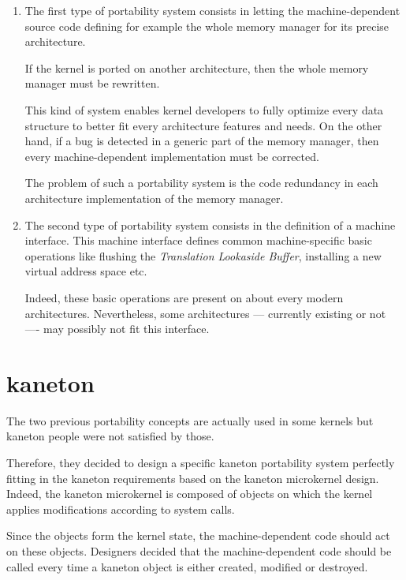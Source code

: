\begin{enumerate}
  \item
    The first type of portability system consists in letting the
    machine-dependent source code defining for example the whole memory manager
    for its precise architecture.

    \-

    If the kernel is ported on another architecture, then the whole memory
    manager must be rewritten.

    \-

    This kind of system enables kernel developers to fully optimize every
    data structure to better fit every architecture features and needs. On
    the other hand, if a bug is detected in a generic part of the memory
    manager, then every machine-dependent implementation must be corrected.

    \-

    The problem of such a portability system is the code redundancy in each
    architecture implementation of the memory manager.
  \item
    The second type of portability system consists in the definition of
    a machine interface. This machine interface defines common machine-specific
    basic operations like flushing the \textit{Translation Lookaside Buffer},
    installing a new virtual address space etc.

    \-

    Indeed, these basic operations are present on about every modern
    architectures. Nevertheless, some architectures --- currently existing or
    not ---- may possibly not fit this interface.
\end{enumerate}

%
%

\section{kaneton}

The two previous portability concepts are actually used in some kernels but
kaneton people were not satisfied by those.

Therefore, they decided to design a specific kaneton portability system
perfectly fitting in the kaneton requirements based on the kaneton microkernel
design. Indeed, the kaneton microkernel is composed of objects on which
the kernel applies modifications according to system calls.

Since the objects form the kernel state, the machine-dependent code should
act on these objects. Designers decided that the machine-dependent code
should be called every time a kaneton object is either created, modified or
destroyed.

